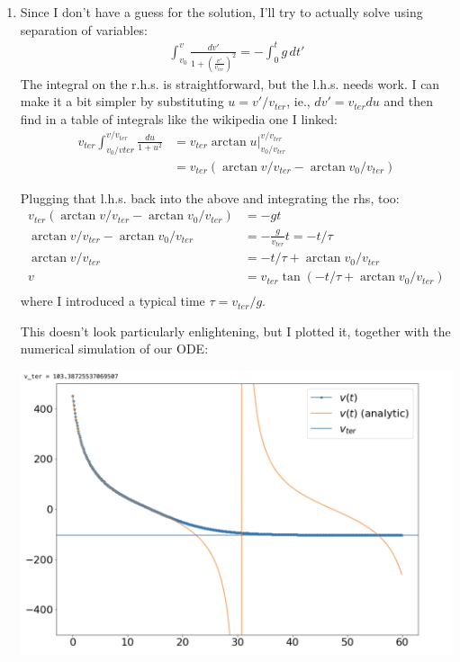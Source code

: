 \documentclass[12pt]{article}
\begin{document}
\begin{enumerate}
\begin{enumerate}
{\begin{enumerate}
                    \item Since I don't have a guess for the solution, I'll try to actually solve using separation of variables:
                          \begin{align*}
                            \int_{v_0}^v \frac{dv'}{1 + \left(\frac{v'}{v_{ter}}\right)^2} = -\int_0^t g\, dt'
                          \end{align*}
                          The integral on the r.h.s. is straightforward, but the l.h.s. needs work. I can make it a bit simpler by substituting $u = v'/v_{ter}$, ie., $dv' = v_{ter} du$ and then find in a table of integrals like the wikipedia one I linked:
                          \begin{align*}
                            v_{ter} \int_{v_0/v{ter}}^{v/v_{ter}} \frac{du}{1 + u^2} & = v_{ter} \left. \arctan u\right|_{v_0/v_{ter}}^{v/v_{ter}} \\
                                                                                     & = v_{ter} (\arctan v/v_{ter} - \arctan {v_0/v_{ter}})
                          \end{align*}

                          Plugging that l.h.s. back into the above and integrating the rhs, too:
                          \begin{align*}
                            v_{ter} (\arctan v/v_{ter} - \arctan v_0/v_{ter}) & = -gt                                          \\
                            \arctan v/v_{ter} - \arctan v_0/v_{ter}           & = -\frac{g}{v_{ter}}t = -t/\tau                \\
                            \arctan v/v_{ter}                                 & = -t/\tau + \arctan v_0/v_{ter}                \\
                            v                                                 & = v_{ter} \tan (-t/\tau + \arctan v_0/v_{ter}) \\
                          \end{align*}
                          where I introduced a typical time $\tau = v_{ter}/g$.

                          This doesn't look particularly enlightening, but I plotted it, together with the numerical simulation of our ODE:

                          \includegraphics[width=.6\textwidth]{bullet_v.png}


\end{enumerate}}
\end{enumerate}
\end{enumerate}
\end{document}
